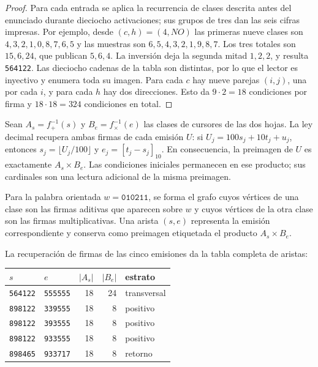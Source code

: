 \begin{proof}
Para cada entrada se aplica la recurrencia de clases descrita antes del
enunciado durante dieciocho activaciones; sus grupos de tres dan las seis
cifras impresas. Por ejemplo, desde $(c,h)=(4,NO)$ las primeras nueve
clases son $4,3,2,1,0,8,7,6,5$ y las muestras son
$6,5,4,3,2,1,9,8,7$. Los tres totales son $15,6,24$, que publican
$5,6,4$. La inversión deja la segunda mitad $1,2,2$, y resulta
\texttt{564122}. Las dieciocho cadenas de la tabla son distintas,
por lo que el lector es inyectivo y enumera toda su imagen. Para cada
$c$ hay nueve parejas $(i,j)$, una por cada $i$, y para cada $h$ hay
dos direcciones. Esto da $9\cdot2=18$ condiciones por firma y
$18\cdot18=324$ condiciones en total.
\end{proof}

Sean $A_s=f_+^{-1}(s)$ y $B_e=f_\times^{-1}(e)$ las clases de cursores
de las dos hojas. La ley decimal recupera ambas firmas de cada emisión
$U$: si $U_j=100s_j+10t_j+u_j$, entonces
$s_j=\lfloor U_j/100\rfloor$ y $e_j=[t_j-s_j]_{10}$.
En consecuencia, la preimagen de $U$ es exactamente $A_s\times B_e$.
Las condiciones iniciales permanecen en ese producto; sus cardinales
son una lectura adicional de la misma preimagen.

\begin{definition}
Para la palabra orientada $w=\texttt{010211}$, se forma el grafo cuyos
vértices de una clase son las firmas aditivas que aparecen sobre $w$ y
cuyos vértices de la otra clase son las firmas multiplicativas. Una
arista $(s,e)$ representa la emisión correspondiente y conserva como
preimagen etiquetada el producto $A_s\times B_e$.
\end{definition}

La recuperación de firmas de las cinco emisiones da la tabla completa
de aristas:
\begin{center}
\begin{tabular}{llrrl}
\toprule
$s$&$e$&$|A_s|$&$|B_e|$&estrato\\
\midrule
\texttt{564122}&\texttt{555555}&18&24&transversal\\
\texttt{898122}&\texttt{339555}&18&8&positivo\\
\texttt{898122}&\texttt{393555}&18&8&positivo\\
\texttt{898122}&\texttt{933555}&18&8&positivo\\
\texttt{898465}&\texttt{933717}&18&8&retorno\\
\bottomrule
\end{tabular}
\end{center}

